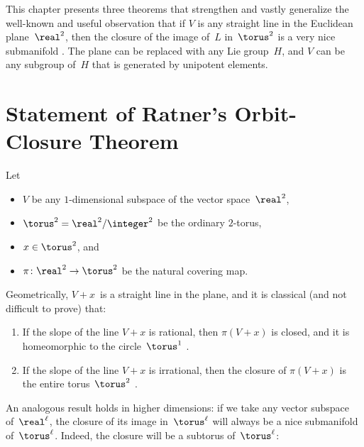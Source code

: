





\label{RatnerChap}



This chapter presents three theorems that strengthen and vastly generalize the  well-known and useful observation that if $V$ is any straight line in the Euclidean plane~$\real^2$, then the closure of the image of~$L$ in~$\torus^2$ is a very nice submanifold . The plane can be replaced with any Lie group~$H$, and $V$ can be any subgroup of~$H$ that is generated by unipotent elements.


\section{Statement of Ratner's Orbit-Closure Theorem}

\begin{eg} \label{LineDenseInT2}
 Let 
 	\begin{itemize}
	\item $V$ be any $1$-dimensional subspace of the vector space~$\real^2$,
	\item $\torus^2   = \real^2 / \integer^2$ be the ordinary $2$-torus,
	\item $x \in \torus^2$,
	and
	\item $\pi \colon \real^2 \to \torus^2$ be the natural covering map.
	\end{itemize}
Geometrically, $V + x$~is a straight line in the plane, and it is classical (and not difficult to prove) that:
	\begin{enumerate}
	\item \label{LineDenseInT2-notdense}
If the slope of the line $V + x$ is rational, then $\pi(V + x)$ is closed, and it is homeomorphic to the circle~$\torus^1$ . 
	\item \label{LineDenseInT2-dense}
If the slope of the line $V + x$ is irrational, then the closure of $\pi(V + x)$ is the entire torus~$\torus^2$ . 
	\end{enumerate}
\end{eg}

An analogous result holds in higher dimensions: 
if we take any vector subspace of~$\real^\ell$, the closure of its image in~$\torus^\ell$ will always be a nice submanifold of~$\torus^\ell$. Indeed, the closure will be a subtorus of~$\torus^\ell$: 

